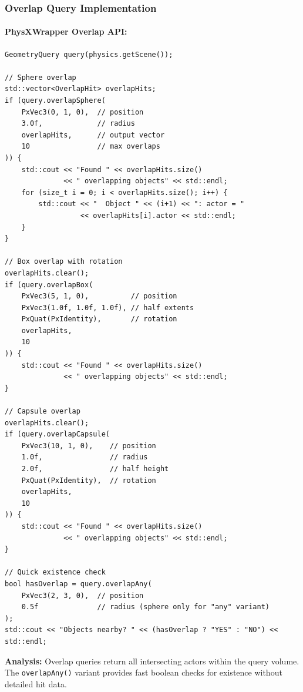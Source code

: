 \subsubsection{Overlap Query Implementation}

\paragraph{PhysXWrapper Overlap API:}

\begin{lstlisting}[style=cpp, caption=Wrapper Overlap Queries]
GeometryQuery query(physics.getScene());

// Sphere overlap
std::vector<OverlapHit> overlapHits;
if (query.overlapSphere(
    PxVec3(0, 1, 0),  // position
    3.0f,             // radius
    overlapHits,      // output vector
    10                // max overlaps
)) {
    std::cout << "Found " << overlapHits.size()
              << " overlapping objects" << std::endl;
    for (size_t i = 0; i < overlapHits.size(); i++) {
        std::cout << "  Object " << (i+1) << ": actor = "
                  << overlapHits[i].actor << std::endl;
    }
}

// Box overlap with rotation
overlapHits.clear();
if (query.overlapBox(
    PxVec3(5, 1, 0),          // position
    PxVec3(1.0f, 1.0f, 1.0f), // half extents
    PxQuat(PxIdentity),       // rotation
    overlapHits,
    10
)) {
    std::cout << "Found " << overlapHits.size()
              << " overlapping objects" << std::endl;
}

// Capsule overlap
overlapHits.clear();
if (query.overlapCapsule(
    PxVec3(10, 1, 0),    // position
    1.0f,                // radius
    2.0f,                // half height
    PxQuat(PxIdentity),  // rotation
    overlapHits,
    10
)) {
    std::cout << "Found " << overlapHits.size()
              << " overlapping objects" << std::endl;
}

// Quick existence check
bool hasOverlap = query.overlapAny(
    PxVec3(2, 3, 0),  // position
    0.5f              // radius (sphere only for "any" variant)
);
std::cout << "Objects nearby? " << (hasOverlap ? "YES" : "NO") << std::endl;
\end{lstlisting}

\textbf{Analysis:} Overlap queries return all intersecting actors within the query volume. The \texttt{overlapAny()} variant provides fast boolean checks for existence without detailed hit data.


